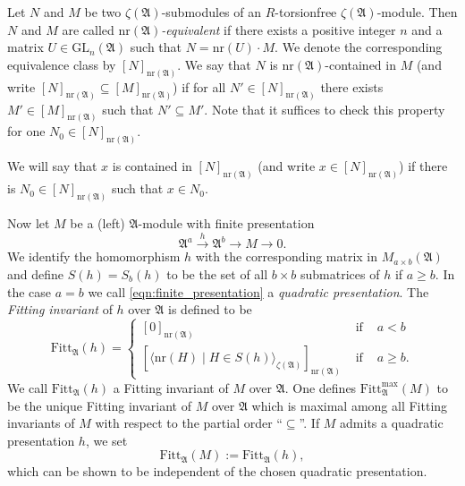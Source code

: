 \documentclass[12pt]{amsart}
\theoremstyle{plain}
\theoremstyle{remark}
\theoremstyle{definition}
\numberwithin{equation}{section}
\begin{document}
Let $N$ and $M$ be two $\zeta(\mathfrak{A})$-submodules of an $R$-torsionfree $\zeta(\mathfrak{A})$-module.
Then $N$ and $M$ are called \emph{${\mathrm{nr}}(\mathfrak{A})$-equivalent} if there exists a positive integer $n$ and a matrix $U \in {\mathrm{GL}}_{n}(\mathfrak{A})$
such that $N = {\mathrm{nr}}(U) \cdot M$.
We denote the corresponding equivalence class by $[N]_{{\mathrm{nr}}(\mathfrak{A})}$.
We say that $N$ is
${\mathrm{nr}}(\mathfrak{A})$-contained in $M$ (and write $[N]_{{\mathrm{nr}}(\mathfrak{A})} \subseteq [M]_{{\mathrm{nr}}(\mathfrak{A})}$)
if for all $N' \in [N]_{{\mathrm{nr}}(\mathfrak{A})}$ there exists $M' \in [M]_{{\mathrm{nr}}(\mathfrak{A})}$
such that $N' \subseteq M'$. Note that it suffices to check this property for one $N_{0} \in [N]_{{\mathrm{nr}}(\mathfrak{A})}$.
    
We will say that $x$ is contained in $[N]_{{\mathrm{nr}}(\mathfrak{A})}$ (and write $x \in [N]_{{\mathrm{nr}}(\mathfrak{A})}$) if there is $N_{0} \in [N]_{{\mathrm{nr}}(\mathfrak{A})}$ such that $x \in N_{0}$.

Now let $M$ be a (left) $\mathfrak{A}$-module with finite presentation
\begin{equation} \label{eqn:finite_presentation}
\mathfrak{A}^a \stackrel{h}{\longrightarrow} \mathfrak{A}^b \longrightarrow M \longrightarrow 0.
\end{equation}
We identify the homomorphism $h$ with the corresponding matrix in $M_{a \times b}(\mathfrak{A})$ and define
$S(h) = S_b(h)$ to be the set of all $b \times b$ submatrices of $h$ if $a \geq b$. In the case $a=b$
we call \eqref{eqn:finite_presentation} a \emph{quadratic presentation}.
The \emph{Fitting invariant} of $h$ over $\mathfrak{A}$ is defined to be
\[
{\mathrm{Fitt}}_{\mathfrak{A}}(h) = \left\{ \begin{array}{lll} [0]_{{\mathrm{nr}}(\mathfrak{A})} & \mbox{ if } & a<b \\
\left[\langle {\mathrm{nr}}(H) \mid H \in S(h)\rangle_{\zeta(\mathfrak{A})}\right]_{{\mathrm{nr}}(\mathfrak{A})} & \mbox{ if } & a \geq b. \end{array} \right.
\]
We call ${\mathrm{Fitt}}_{\mathfrak{A}}(h)$ a Fitting invariant of $M$ over $\mathfrak{A}$.
One defines ${\mathrm{Fitt}}_{\mathfrak{A}}^{\max}(M)$ to be the unique Fitting invariant of $M$ over $\mathfrak{A}$ which is maximal among all Fitting invariants of $M$ with respect to the partial order ``$\subseteq$''.
If $M$ admits a quadratic presentation $h$,
we set 
\begin{equation}\label{eq:quad-fitt-defn}
{\mathrm{Fitt}}_{\mathfrak{A}}(M) := {\mathrm{Fitt}}_{\mathfrak{A}}(h),
\end{equation}
which can be shown to be independent of the chosen quadratic presentation.
\end{document}
